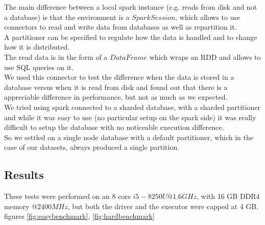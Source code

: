 \documentclass[a4paper]{article}
\begin{document}
	The main difference between a local spark instance (e.g. reads from disk and not a database) is that the environment is a $SparkSession$, which allows to use connectors to read and write data from databases as well as repartition it.\\
	A partitioner can be specified to regulate how the data is handled and to change how it is distributed.\\	
	The read data is in the form of a $DataFrame$ which wraps an RDD and allows to use SQL queries on it.\\

	We used this connector to test the difference when the data is stored in a database versus when it is read from disk and found out that there is a appreciable difference in performance, but not as much as we expected.\\

	We tried using spark connected to a sharded database, with a sharded partitioner and while it was easy to use (no particular setup on the spark side) it was really difficult to setup the database with no noticeable execution difference.\\
	So we settled on a single node database with a default partitioner, which in the case of our datasets, always produced a single partition.\\

	\subsection{Results}
	These tests were performed on an 8 core $i5-8250U @1.6GHz$, with 16 GB DDR4 memory $@2400MHz$, but both the driver and the executor were capped at 4 GB.
	figures \ref{fig:easybenchmark}, \ref{fig:hardbenchmark}
\end{document}
